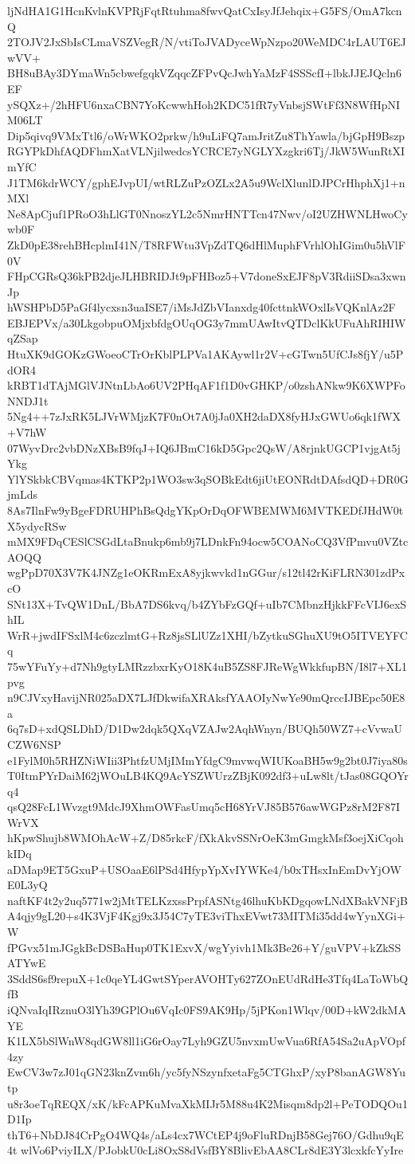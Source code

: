ljNdHA1G1HcnKvlnKVPRjFqtRtuhma8fwvQatCxIsyJfJehqix+G5FS/OmA7kcnQ
2TOJV2JxSbIsCLmaVSZVegR/N/vtiToJVADyceWpNzpo20WeMDC4rLAUT6EJwVV+
BH8uBAy3DYmaWn5cbwefgqkVZqqcZFPvQcJwhYaMzF4SSScfI+lbkJJEJQcln6EF
ySQXz+/2hHFU6nxaCBN7YoKcwwhHoh2KDC51fR7yVnbsjSWtFf3N8WfHpNIM06LT
Dip5qivq9VMxTtl6/oWrWKO2prkw/h9uLiFQ7amJritZu8ThYawla/bjGpH9Bszp
RGYPkDhfAQDFhmXatVLNjilwedcsYCRCE7yNGLYXzgkri6Tj/JkW5WunRtXImYfC
J1TM6kdrWCY/gphEJvpUI/wtRLZuPzOZLx2A5u9WclXlunlDJPCrHhphXj1+nMXl
Ne8ApCjuf1PRoO3hLlGT0NnoszYL2c5NmrHNTTcn47Nwv/oI2UZHWNLHwoCywb0F
ZkD0pE38rehBHcplmI41N/T8RFWtu3VpZdTQ6dHlMuphFVrhlOhIGim0u5hVlF0V
FHpCGRsQ36kPB2djeJLHBRIDJt9pFHBoz5+V7doneSxEJF8pV3RdiiSDsa3xwnJp
hWSHPbD5PaGf4lycxsn3uaISE7/iMsJdZbVIanxdg40fcttnkWOxlIsVQKnlAz2F
EBJEPVx/a30LkgobpuOMjxbfdgOUqOG3y7mmUAwItvQTDclKkUFuAhRIHIWqZSap
HtuXK9dGOKzGWoeoCTrOrKblPLPVa1AKAywl1r2V+cGTwn5UfCJs8fjY/u5PdOR4
kRBT1dTAjMGlVJNtnLbAo6UV2PHqAF1f1D0vGHKP/o0zshANkw9K6XWPFoNNDJ1t
5Ng4++7zJxRK5LJVrWMjzK7F0nOt7A0jJa0XH2daDX8fyHJxGWUo6qk1fWX+V7hW
07WyvDrc2vbDNzXBsB9fqJ+IQ6JBmC16kD5Gpc2QsW/A8rjnkUGCP1vjgAt5jYkg
YlYSkbkCBVqmas4KTKP2p1WO3sw3qSOBkEdt6jiUtEONRdtDAfsdQD+DR0GjmLds
8As7IlnFw9yBgeFDRUHPhBsQdgYKpOrDqOFWBEMWM6MVTKEDfJHdW0tX5ydycRSw
mMX9FDqCESlCSGdLtaBnukp6mb9j7LDnkFn94ocw5COANoCQ3VfPmvu0VZtcAOQQ
wgPpD70X3V7K4JNZg1eOKRmExA8yjkwvkd1nGGur/s12tl42rKiFLRN301zdPxcO
SNt13X+TvQW1DnL/BbA7DS6kvq/b4ZYbFzGQf+uIb7CMbnzHjkkFFcVIJ6exShIL
WrR+jwdIFSxlM4c6zczlmtG+Rz8jsSLlUZz1XHI/bZytkuSGhuXU9tO5ITVEYFCq
75wYFuYy+d7Nh9gtyLMRzzbxrKyO18K4uB5ZS8FJReWgWkkfupBN/I8l7+XL1pvg
n9CJVxyHavijNR025aDX7LJfDkwifaXRAksfYAAOIyNwYe90mQrccIJBEpc50E8a
6q7sD+xdQSLDhD/D1Dw2dqk5QXqVZAJw2AqhWnyn/BUQh50WZ7+cVvwaUCZW6NSP
e1FylM0h5RHZNiWIii3PhtfzUMjIMmYfdgC9mvwqWIUKoaBH5w9g2bt0J7iya80s
T0ItmPYrDaiM62jWOuLB4KQ9AcYSZWUrzZBjK092df3+uLw8lt/tJas08GQOYrq4
qsQ28FcL1Wvzgt9MdcJ9XhmOWFasUmq5cH68YrVJ85B576awWGPz8rM2F87IWrVX
hKpwShujb8WMOhAcW+Z/D85rkcF/fXkAkvSSNrOeK3mGmgkMsf3oejXiCqohkIDq
aDMap9ET5GxuP+USOaaE6lPSd4HfypYpXvIYWKe4/b0xTHsxInEmDvYjOWE0L3yQ
naftKF4t2y2uq5771w2jMtTELKzxssPrpfASNtg46lhuKbKDgqowLNdXBakVNFjB
A4qjy9gL20+s4K3VjF4Kgj9x3J54C7yTE3viThxEVwt73MITMi35dd4wYynXGi+W
fPGvx51mJGgkBcDSBaHup0TK1ExvX/wgYyivh1Mk3Be26+Y/guVPV+kZkSSATYwE
3SddS6sf9repuX+1c0qeYL4GwtSYperAVOHTy627ZOnEUdRdHe3Tfq4LaToWbQfB
iQNvaIqIRznuO3lYh39GPlOu6VqIc0FS9AK9Hp/5jPKon1Wlqv/00D+kW2dkMAYE
K1LX5bSlWnW8qdGW8ll1iG6rOay7Lyh9GZU5nvxmUwVua6RfA54Sa2uApVOpf4zy
EwCV3w7zJ01qGN23knZvm6h/yc5fyNSzynfxetaFg5CTGhxP/xyP8banAGW8Yutp
u8r3oeTqREQX/xK/kFcAPKuMvaXkMIJr5M88u4K2Misqm8dp2l+PeTODQOu1D1Ip
thT6+NbDJ84CrPgO4WQ4s/aLs4cx7WCtEP4j9oFluRDnjB58Gej76O/Gdhu9qE4t
wlVo6PviyILX/PJobkU0cLi8OxS8dVsfBY8BlivEbAA8CLr8dE3Y3lcxkfcYyIre
